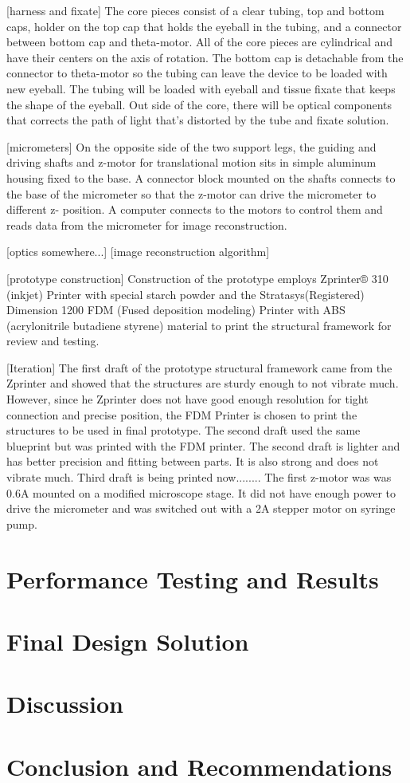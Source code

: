 \documentclass{article}
\begin{document}
[harness and fixate]
	The core pieces consist of a clear tubing, top and bottom caps, holder on the top cap that holds 
the eyeball in the tubing, and a connector between bottom cap and theta-motor. All of the core pieces are 
cylindrical and have their centers on the axis of rotation. The bottom cap is detachable from the connector 
to theta-motor so the tubing can leave the device to be loaded with new eyeball. The tubing will be loaded 
with eyeball and tissue fixate that keeps the shape of the eyeball. Out side of the core, there will be optical 
components that corrects the path of light that's distorted by the tube and fixate solution.

[micrometers]
	On the opposite side of the two support legs, the guiding and driving shafts and z-motor for 
translational motion sits in simple aluminum housing fixed to the base. A connector block mounted on the 
shafts connects to the base of the micrometer so that the z-motor can drive the micrometer to different z-
position. A computer connects to the motors to control them and reads data from the micrometer for image 
reconstruction. 
	
[optics somewhere...]
[image reconstruction algorithm]

[prototype construction]
	Construction of the prototype employs Zprinter® 310 (inkjet) Printer with special starch powder 
and the Stratasys(Registered) Dimension 1200 FDM (Fused deposition modeling) Printer with ABS 
(acrylonitrile butadiene styrene) material to print the structural framework for review and testing.

[Iteration]
	The first draft of the prototype structural framework came from the Zprinter and showed that the 
structures are sturdy enough to not vibrate much. However, since he Zprinter does not have good enough 
resolution for tight connection and precise position, the FDM Printer is chosen to print the structures to be 
used in final prototype. The second draft used the same blueprint but was printed with the FDM printer. The 
second draft is lighter and has better precision and fitting between parts. It is also strong and does not 
vibrate much.  Third draft is being printed now........
	The first z-motor was was 0.6A mounted on a modified microscope stage. It did not have enough 
power to drive the micrometer and was switched out with a 2A stepper motor on syringe pump.


\section{Performance Testing and Results}
\label{sec:perf-test-results}

\section{Final Design Solution}
\label{sec:final-design-solut}

\section{Discussion}
\label{sec:discussion}

\section{Conclusion and Recommendations}
\label{sec:concl-recomm}

\newpage
{}


\end{document}
